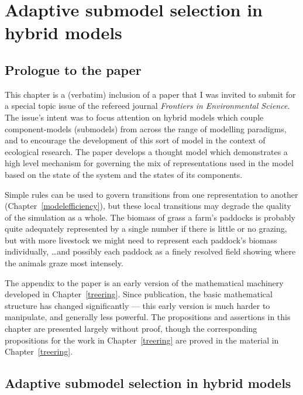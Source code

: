 

\chapter[ADAPTIVE SUBMODEL SELECTION IN HYBRID MODELS]{Adaptive submodel selection in hybrid  models}\label{adaptiveselection}

\WeAreOn{\cthree}
\section{Prologue to the paper}  
This chapter is a (verbatim) inclusion of a paper that I was invited
to submit for a special topic issue of the refereed journal
\emph{Frontiers in Environmental Science}. The issue's intent was to
focus attention on hybrid models which couple component-models
(submodels) from across the range of modelling paradigms, and to
encourage the development of this sort of model in the context of
ecological research.  The paper develops a thought model which
demonstrates a high level mechanism for governing the mix of
representations used in the model based on the state of the system and
the states of its components.

Simple rules can be used to govern transitions from one representation
to another (Chapter~\ref{modelefficiency}), but these local
transitions may degrade the quality of the simulation as a whole. The
biomass of grass a farm's paddocks is probably quite
adequately represented by a single number if there is little or no
grazing, but with more livestock we might need to represent each
paddock's biomass individually, \ldots and possibly each paddock as a
finely resolved field showing where the animals graze most intensely.

The appendix to the paper is an early version of the mathematical
machinery developed in Chapter~\ref{treering}. Since publication, the
basic mathematical structure has changed significantly --- this early
version is much harder to manipulate, and generally less powerful.
The propositions and assertions in this chapter are presented largely
without proof, though the corresponding propositions for the work in
Chapter~\ref{treering} are proved in the material in Chapter~\ref{treering}.

\pagebreak
{}
\section*{Adaptive submodel selection in hybrid  models}

